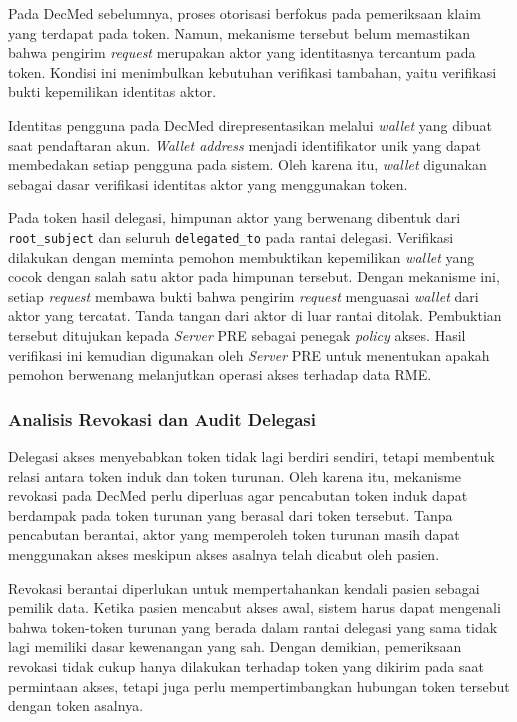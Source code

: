 \documentclass[bahasa, 12pt, a4paper, onecolumn, oneside, final]{report}
\begin{document}
Pada DecMed sebelumnya, proses otorisasi berfokus pada pemeriksaan klaim yang terdapat pada token. Namun, mekanisme tersebut belum memastikan bahwa pengirim \textit{request} merupakan aktor yang identitasnya tercantum pada token. Kondisi ini menimbulkan kebutuhan verifikasi tambahan, yaitu verifikasi bukti kepemilikan identitas aktor.

Identitas pengguna pada DecMed direpresentasikan melalui \textit{wallet} yang dibuat saat pendaftaran akun. \textit{Wallet address} menjadi identifikator unik yang dapat membedakan setiap pengguna pada sistem. Oleh karena itu, \textit{wallet} digunakan sebagai dasar verifikasi identitas aktor yang menggunakan token.

Pada token hasil delegasi, himpunan aktor yang berwenang dibentuk dari \texttt{root\_subject} dan seluruh \texttt{delegated\_to} pada rantai delegasi. Verifikasi dilakukan dengan meminta pemohon membuktikan kepemilikan \textit{wallet} yang cocok dengan salah satu aktor pada himpunan tersebut. Dengan mekanisme ini, setiap \textit{request} membawa bukti bahwa pengirim \textit{request} menguasai \textit{wallet} dari aktor yang tercatat. Tanda tangan dari aktor di luar rantai ditolak. Pembuktian tersebut ditujukan kepada \textit{Server} PRE sebagai penegak \textit{policy} akses. Hasil verifikasi ini kemudian digunakan oleh \textit{Server} PRE untuk menentukan apakah pemohon berwenang melanjutkan operasi akses terhadap data RME.

\subsubsection{Analisis Revokasi dan Audit Delegasi}
\label{subsec:analisis-revokasi-audit-delegasi}

Delegasi akses menyebabkan token tidak lagi berdiri sendiri, tetapi membentuk relasi antara token induk dan token turunan. Oleh karena itu, mekanisme revokasi pada DecMed perlu diperluas agar pencabutan token induk dapat berdampak pada token turunan yang berasal dari token tersebut. Tanpa pencabutan berantai, aktor yang memperoleh token turunan masih dapat menggunakan akses meskipun akses asalnya telah dicabut oleh pasien.

Revokasi berantai diperlukan untuk mempertahankan kendali pasien sebagai pemilik data. Ketika pasien mencabut akses awal, sistem harus dapat mengenali bahwa token-token turunan yang berada dalam rantai delegasi yang sama tidak lagi memiliki dasar kewenangan yang sah. Dengan demikian, pemeriksaan revokasi tidak cukup hanya dilakukan terhadap token yang dikirim pada saat permintaan akses, tetapi juga perlu mempertimbangkan hubungan token tersebut dengan token asalnya.
\end{document}
